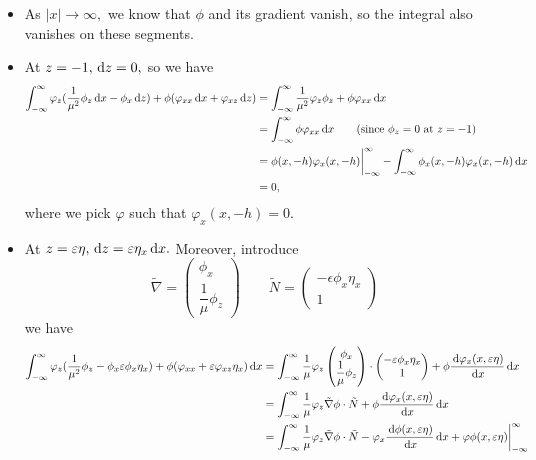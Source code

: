 \documentclass[10pt,reqno,oneside,a4paper]{article}
\begin{document}
\begin{itemize}
\item As $|x| \to \infty,$ we know that $\phi$ and its gradient vanish, so the integral also vanishes on these segments.
\item At $z = -1, \,\mathrm{d} z = 0,$ so we have 
\begin{align*}
\int^{\infty}_{-\infty}\varphi_z (\frac{1}{\mu^2} \phi_z \,\mathrm{d} x - \phi_x \,\mathrm{d} z) + \phi(\varphi_{xx} \,\mathrm{d} x + \varphi_{xz} \,\mathrm{d} z) &= \int^{\infty}_{-\infty}\frac{1}{\mu^2} \varphi_z \phi_z + \phi \varphi_{xx} \,\mathrm{d} x \\
&= \int^{\infty}_{-\infty} \phi \varphi_{xx} \,\mathrm{d} x \qquad \text{(since $\phi_z=0$ at $z =-1$)} \\
&= \phi(x,-h) \varphi_x(x, -h) \bigg|^{\infty}_{-\infty} - \int^{\infty}_{-\infty} \phi_x(x,-h)\varphi_x(x,-h) \,\mathrm{d} x \\
&= 0,
\end{align*}
where we pick $\varphi$ such that $\varphi_x(x, -h) = 0.$
\item At $z = \varepsilon \eta, \,\mathrm{d} z = \varepsilon \eta_x \,\mathrm{d} x.$ Moreover, introduce 
\[ \tilde{\nabla} = \begin{pmatrix} \phi_x  \\ \dfrac{1}{\mu}\phi_z \end{pmatrix} \qquad \tilde{N} = \begin{pmatrix} -\epsilon \phi_x \eta_x \\ 1 \end{pmatrix} \] we have 
\begin{align*}
\int_{-\infty}^{\infty} \varphi_z(\frac{1}{\mu^2}\phi_z - \phi_x \epsilon \phi_x \eta_x ) + \phi(\varphi_{xx}  + \epsilon \varphi_{xz} \eta_x) \D x &= \int_{-\infty}^{\infty}\frac{1}{\mu} \varphi_z \begin{pmatrix} \phi_x  \\ \dfrac{1}{\mu}\phi_z \end{pmatrix}\cdot \begin{pmatrix} -\epsilon \phi_x \eta_x \\ 1 \end{pmatrix} + \phi \frac{\D \varphi_x(x, \epsilon \eta)}{\D x} \D x \\
&= \int_{-\infty}^{\infty} \frac{1}{\mu} \varphi_z \tilde{\nabla} \phi \cdot \tilde{N}+ \phi \frac{\D \varphi_x(x, \epsilon \eta)}{\D x} \D x \\
&= \int_{-\infty}^{\infty} \frac{1}{\mu} \varphi_z \tilde{\nabla} \phi \cdot \tilde{N} -\varphi_x \frac{\D \phi(x, \epsilon \eta)}{\D x} \D x + \varphi \phi(x, \epsilon \eta) \bigg|^{\infty}_{-\infty} \\

\end{align*}
\end{itemize}
\end{document}
